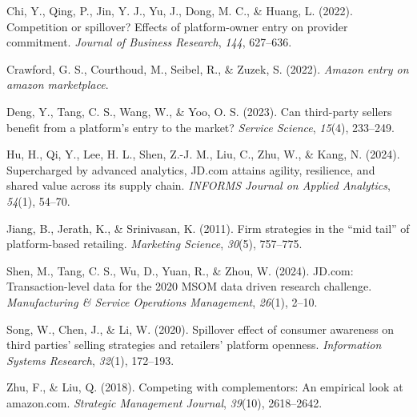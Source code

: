 \documentclass[
  letterpaper,
  DIV=11,
  numbers=noendperiod]{scrartcl}
\newlength{\cslhangindent}
\newenvironment{CSLReferences}[2] %
 {\begin{list}{}{%
  \setlength{\itemindent}{0pt}
  \setlength{\leftmargin}{0pt}
  \setlength{\parsep}{0pt}
  \ifodd #1
   \setlength{\leftmargin}{\cslhangindent}
   \setlength{\itemindent}{-1\cslhangindent}
  \fi
  \setlength{\itemsep}{#2\baselineskip}}}
 {\end{list}}
\begin{document}
\label{refs}
\begin{CSLReferences}{1}{0}
Chi, Y., Qing, P., Jin, Y. J., Yu, J., Dong, M. C., \& Huang, L. (2022).
Competition or spillover? Effects of platform-owner entry on provider
commitment. \emph{Journal of Business Research}, \emph{144}, 627--636.

Crawford, G. S., Courthoud, M., Seibel, R., \& Zuzek, S. (2022).
\emph{Amazon entry on amazon marketplace}.

Deng, Y., Tang, C. S., Wang, W., \& Yoo, O. S. (2023). Can third-party
sellers benefit from a platform's entry to the market? \emph{Service
Science}, \emph{15}(4), 233--249.

Hu, H., Qi, Y., Lee, H. L., Shen, Z.-J. M., Liu, C., Zhu, W., \& Kang,
N. (2024). Supercharged by advanced analytics, JD.com attains agility,
resilience, and shared value across its supply chain. \emph{INFORMS
Journal on Applied Analytics}, \emph{54}(1), 54--70.

Jiang, B., Jerath, K., \& Srinivasan, K. (2011). Firm strategies in the
{``mid tail''} of platform-based retailing. \emph{Marketing Science},
\emph{30}(5), 757--775.

Shen, M., Tang, C. S., Wu, D., Yuan, R., \& Zhou, W. (2024). JD.com:
Transaction-level data for the 2020 MSOM data driven research challenge.
\emph{Manufacturing \& Service Operations Management}, \emph{26}(1),
2--10.

Song, W., Chen, J., \& Li, W. (2020). Spillover effect of consumer
awareness on third parties' selling strategies and retailers' platform
openness. \emph{Information Systems Research}, \emph{32}(1), 172--193.

Zhu, F., \& Liu, Q. (2018). Competing with complementors: An empirical
look at amazon.com. \emph{Strategic Management Journal}, \emph{39}(10),
2618--2642.

\end{CSLReferences}
\end{document}
